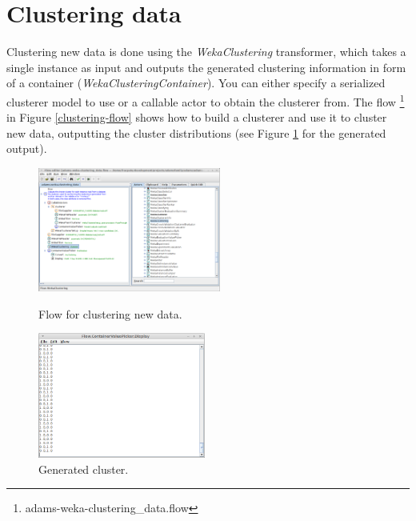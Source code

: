 \section{Clustering data}
Clustering new data is done using the \textit{WekaClustering} transformer, which
takes a single instance as input and outputs the generated clustering
information in form of a container (\textit{WekaClusteringContainer}). You can
either specify a serialized clusterer model to use or a callable actor to obtain
the clusterer from. The flow \footnote{adams-weka-clustering\_data.flow} in
Figure \ref{clustering-flow} shows how to build a clusterer and use it to
cluster new data, outputting the cluster distributions (see Figure
\ref{clustering-output} for the generated output).

\begin{figure}[ht]
  \begin{minipage}[t]{0.5\linewidth}
    \centering
    \includegraphics[width=6.0cm]{images/clustering-flow.png}
    \caption{Flow for clustering new data.}
    \label{clustering-flow}
  \end{minipage}
  \hspace{0.5cm}
  \begin{minipage}[t]{0.5\linewidth}
    \centering
    \includegraphics[width=5.5cm]{images/clustering-output.png}
    \caption{Generated cluster.}
    \label{clustering-output}
  \end{minipage}
\end{figure}
